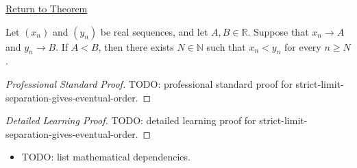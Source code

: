 \newpage
{}
\label{prf:strict-limit-separation-gives-eventual-order}

\begin{remark*}[Return]
\hyperref[thm:strict-limit-separation-gives-eventual-order]{Return to Theorem}
\end{remark*}

\begin{theorem*}
Let $(x_n)$ and $(y_n)$ be real sequences, and let $A,B\in\mathbb{R}$.
Suppose that $x_n\to A$ and $y_n\to B$. If $A<B$, then there exists
$N\in\mathbb{N}$ such that $x_n<y_n$ for every $n\ge N$.

\smallskip
\noindent
\end{theorem*}

\begin{proof}[Professional Standard Proof]
\LRAProofBodyStart
TODO: professional standard proof for strict-limit-separation-gives-eventual-order.
\end{proof}

\begin{proof}[Detailed Learning Proof]
\LRAProofBodyStart
TODO: detailed learning proof for strict-limit-separation-gives-eventual-order.
\end{proof}

\begin{remark*}
\end{remark*}

\begin{dependencies}
\begin{itemize}
  \item TODO: list mathematical dependencies.
\end{itemize}
\end{dependencies}

\clearpage

